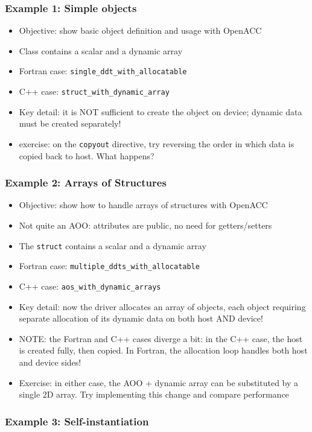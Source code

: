 \begin{frame}
    \frametitle{Example 1: Simple objects}
    \begin{itemize}
        \item Objective: show basic object definition and usage with OpenACC
        \item Class contains a scalar and a dynamic array
        \item Fortran case: \texttt{single\_ddt\_with\_allocatable}
        \item C++ case: \texttt{struct\_with\_dynamic\_array}
        \item Key detail: it is NOT sufficient to create the object on device; dynamic data must be created separately!
        \item exercise: on the \texttt{copyout} directive, try reversing the order in which data is copied back to host. What happens?
    \end{itemize}
\end{frame}

\begin{frame}
    \frametitle{Example 2: Arrays of Structures}
    \begin{itemize}
        \item Objective: show how to handle arrays of structures with OpenACC
        \item Not quite an AOO: attributes are public, no need for getters/setters
        \item The \texttt{struct} contains a scalar and a dynamic array
        \item Fortran case: \texttt{multiple\_ddts\_with\_allocatable}
        \item C++ case: \texttt{aos\_with\_dynamic\_arrays}
        \item Key detail: now the driver allocates an array of objects, each object requiring separate allocation of its dynamic data on both host AND device!
        \item NOTE: the Fortran and C++ cases diverge a bit: in the C++ case, the host is created fully, then copied. In Fortran, the allocation loop handles both host and device sides!
        \item Exercise: in either case, the AOO + dynamic array can be substituted by a single 2D array. Try implementing this change and compare performance
    \end{itemize}
\end{frame}

\begin{frame}
    \frametitle{Example 3: Self-instantiation}
\end{frame}

